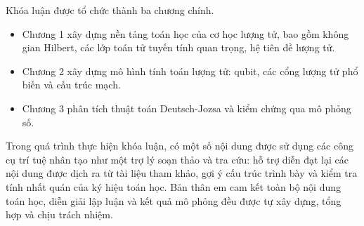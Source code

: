 Khóa luận được tổ chức thành ba chương chính.
\begin{itemize}
    \item Chương 1 xây dựng nền tảng toán học của cơ học lượng tử, bao gồm không gian Hilbert, các lớp toán tử tuyến tính quan trọng, hệ tiên đề lượng tử.
    \item Chương 2 xây dựng mô hình tính toán lượng tử: qubit, các cổng lượng tử phổ biến và cấu trúc mạch.
    \item Chương 3 phân tích thuật toán Deutsch-Jozsa và kiểm chứng qua mô phỏng số.
\end{itemize}  

Trong quá trình thực hiện khóa luận, có một số nội dung được sử dụng các công cụ trí tuệ nhân tạo như một trợ lý soạn thảo và tra cứu: hỗ trợ diễn đạt lại các nội dung được dịch ra từ tài liệu tham khảo, gợi ý cấu trúc trình bày và kiểm tra tính nhất quán của ký hiệu toán học. Bản thân em cam kết toàn bộ nội dung toán học, diễn giải lập luận và kết quả mô phỏng đều được tự xây dựng, tổng hợp và chịu trách nhiệm.